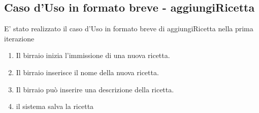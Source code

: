 \documentclass[a4paper,12pt]{report}
\begin{document}
		\subsection{Caso d'Uso in formato breve - aggiungiRicetta}
			E' stato realizzato il caso d'Uso in formato breve di aggiungiRicetta nella prima iterazione
			\begin{enumerate}
    				\item Il birraio inizia l'immissione di una nuova ricetta.
    				\item Il birraio inserisce il nome della nuova ricetta.
				\item Il birraio può inserire una descrizione della ricetta.
    				\item il sistema salva la ricetta		
			\end{enumerate}		
	
\end{document}
